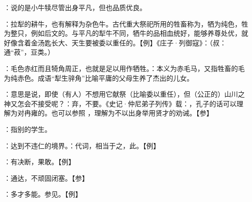 {
\item {}：说的是小牛犊尽管出身平凡，但也品质优良。

：拉犁的耕牛，也有解释为杂色牛。古代重大祭祀所用的牲畜称为，牺为纯色，牲为整只，例如后文的。与平凡的犁牛不同，牺牛的品相血统好，能够养尊处优，就好像含着金汤匙长大、天生要被委以重任的。【例】《庄子·列御寇》：（叔：通“菽”，豆类。）

：毛色赤红而且犄角周正，也就是足以用作牺牲。：本义为赤毛马，又指牲畜的毛为纯赤色。成语“犁生骍角”比喻平庸的父母生养了杰出的儿女。%

\item {}：意思是说，即使（有人）不想用它献祭（比喻委以重任），但（公正的）山川之神又怎会不接受呢？：弃，不要。《史记·仲尼弟子列传》载：，孔子的话可以理解为对冉雍的。也可以参照 ，理解为不以出身举用贤才的劝诫。【参】
}
{}


{
\item {}：指别的学生。
\item {}：达到不违仁的境界。：代词，相当于之，此。【例】 
}
{}


{
\item {}：有决断，果敢。【例】 
\item {}：通达，不顽固闭塞。【参】 
\item {}：多才多能。参见。【例】 
}
{}


